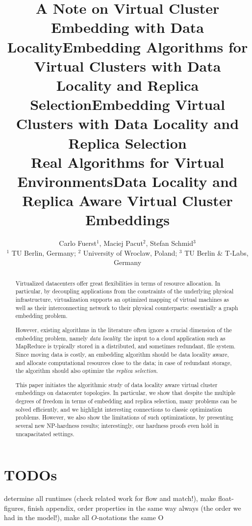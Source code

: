 \documentclass[9pt]{sigcomm-alternate}
\title{A Note on Virtual Cluster Embedding with Data Locality}
\title{Embedding Algorithms for Virtual Clusters with Data Locality and Replica Selection}
\title{Embedding Virtual Clusters with Data Locality and Replica Selection\\{\Large Real Algorithms for Virtual Environments}}
\title{Data Locality and Replica Aware Virtual Cluster Embeddings}
\author{Carlo Fuerst$^1$, Maciej Pacut$^2$, Stefan Schmid$^3$\\
{\small $^1$ TU Berlin, Germany; $^2$ University of Wroclaw, Poland; $^3$ TU Berlin \& T-Labs, Germany}}
\begin{document}
\maketitle


\begin{abstract}
Virtualized datacenters offer great flexibilities in terms of resource allocation. In particular, by
decoupling applications from the constraints of the underlying physical infrastructure, virtualization
supports an optimized mapping of virtual machines as well as their interconnecting network
to their
physical counterparts: essentially a graph embedding problem.

However, existing algorithms
in the literature often ignore a crucial dimension of the embedding problem, namely \emph{data locality}:
the input to a cloud application such as MapReduce is typically stored in a distributed,
and sometimes redundant, file system. Since moving
data is costly, an embedding algorithm should be data locality aware,
and allocate computational resources close to the data; in case of redundant storage, the algorithm should also optimize the \emph{replica selection}.

This paper initiates the algorithmic study of data locality aware virtual cluster embeddings
on datacenter topologies.
In particular, we
show that
despite the multiple degrees of freedom in terms of embedding and replica selection,
many problems can be
solved efficiently, and we highlight interesting connections
to classic optimization problems. However, we also show the limitations of such optimizations,
by presenting several new NP-hardness results; interestingly,
our hardness proofs even hold in uncapacitated settings.
\end{abstract}

\section*{TODOs}

determine all runtimes (check related work for flow and match!), make float-figures, finish appendix, order properties in the same way always (the order we had in the model!), make all $O$-notations the same $\mathrm{O}$
\end{document}
